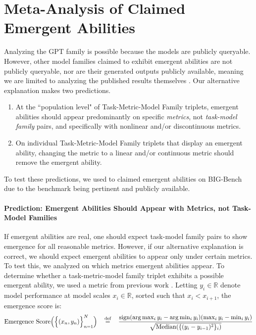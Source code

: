 \section{Meta-Analysis of Claimed Emergent Abilities}

Analyzing the GPT family is possible because the models are publicly queryable.
However, other model families claimed to exhibit emergent abilities are not publicly queryable, nor are their generated outputs publicly available, meaning we are limited to analyzing the published results themselves \cite{ganguli2022predictability, wei2022emergent, wei2022bigbench}.
Our alternative explanation makes two predictions.
\begin{enumerate}
    \item At the ``population level" of Task-Metric-Model Family triplets, emergent abilities should appear predominantly on specific \textit{metrics}, not \textit{task-model family} pairs, and specifically with nonlinear and/or discontinuous metrics.
    \item On individual Task-Metric-Model Family triplets that display an emergent ability, changing the metric to a linear and/or continuous metric should remove the emergent ability.
\end{enumerate}

To test these predictions, we used to claimed emergent abilities on BIG-Bench \cite{srivastava2022beyond, wei2022emergent} due to the benchmark being pertinent and publicly available.

\paragraph{Prediction: Emergent Abilities Should Appear with Metrics, not Task-Model Families}

If emergent abilities are real, one should expect task-model family pairs to show emergence for all reasonable metrics. However, if our alternative explanation is correct, we should expect emergent abilities to appear only under certain metrics. To test this, we analyzed on which metrics emergent abilities appear. To determine whether a task-metric-model family triplet exhibits a possible emergent ability, we used a metric from previous work \cite{srivastava2022beyond}. Letting $y_i \in \mathbb{R}$ denote model performance at model scales $x_i \in \mathbb{R}$, sorted such that $x_i < x_{i+1}$, the emergence score is:
%
\begin{equation}
    \text{Emergence Score}\Big(\Big\{ (x_n, y_n) \Big\}_{n=1}^N \Big) \quad \operatorname{\stackrel{\text{def}}{=}} \quad \frac{\text{sign}(\arg \max_i y_i - \arg \min_i y_i)(\max_i y_i - \min_i y_i)}{\sqrt{\text{Median}(\{ (y_i - y_{i-1})^2 \}_i)}}
\end{equation}



